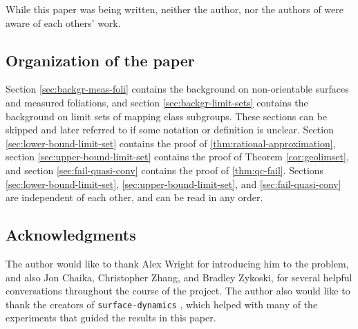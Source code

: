 While this paper was being written, neither the author, nor the authors of \cite{erlandsson2023mapping} were aware of each others' work.

\subsection*{Organization of the paper}
Section \ref{sec:backgr-meas-foli} contains the background on non-orientable surfaces and measured foliations, and section \ref{sec:backgr-limit-sets} contains the background on limit sets of mapping class subgroups.
These sections can be skipped and later referred to if some notation or definition is unclear.
Section \ref{sec:lower-bound-limit-set} contains the proof of \autoref{thm:rational-approximation}, section \ref{sec:upper-bound-limit-set} contains the proof of Theorem \ref{cor:geolimset}, and section \ref{sec:fail-quasi-conv} contains the proof of \autoref{thm:qc-fail}.
Sections \ref{sec:lower-bound-limit-set}, \ref{sec:upper-bound-limit-set}, and \ref{sec:fail-quasi-conv} are independent of each other, and can be read in any order.

\subsection*{Acknowledgments}
The author would like to thank Alex Wright for introducing him to the problem, and also Jon Chaika, Christopher Zhang, and Bradley Zykoski, for several helpful conversations throughout the course of the project.
The author also would like to thank the creators of \texttt{surface-dynamics} \cite{vincent_delecroix_2021_5057590}, which helped with many of the experiments that guided the results in this paper.

